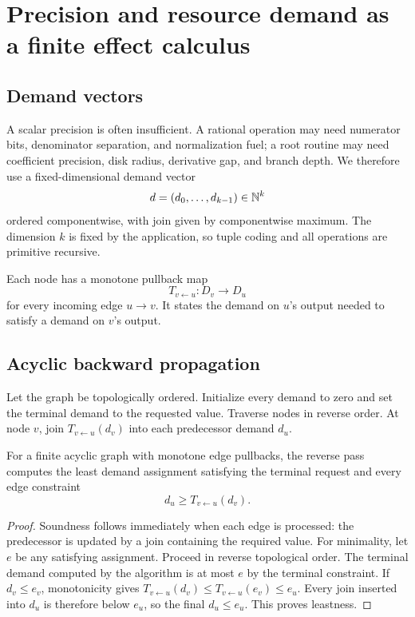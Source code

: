 \section{Precision and resource demand as a finite effect calculus}

\subsection{Demand vectors}

A scalar precision is often insufficient.  A rational operation may need
numerator bits, denominator separation, and normalization fuel; a root routine
may need coefficient precision, disk radius, derivative gap, and branch depth.
We therefore use a fixed-dimensional demand vector
\[
      d=(d_0,\ldots,d_{k-1})\in\mathbb N^k
\]
ordered componentwise, with join given by componentwise maximum.  The dimension
\(k\) is fixed by the application, so tuple coding and all operations are
primitive recursive.

Each node has a monotone pullback map
\[
       T_{v\leftarrow u}:D_v\to D_u
\]
for every incoming edge \(u\to v\).  It states the demand on \(u\)'s output
needed to satisfy a demand on \(v\)'s output.

\subsection{Acyclic backward propagation}

Let the graph be topologically ordered.  Initialize every demand to zero and
set the terminal demand to the requested value.  Traverse nodes in reverse
order.  At node \(v\), join
\(T_{v\leftarrow u}(d_v)\) into each predecessor demand \(d_u\).

\begin{theorem}\label{thm:acyclic-demand}
For a finite acyclic graph with monotone edge pullbacks, the reverse pass
computes the least demand assignment satisfying the terminal request and every
edge constraint
\[
       d_u\ge T_{v\leftarrow u}(d_v).
\]
\end{theorem}

\begin{proof}
Soundness follows immediately when each edge is processed: the predecessor is
updated by a join containing the required value.  For minimality, let \(e\) be
any satisfying assignment.  Proceed in reverse topological order.  The terminal
demand computed by the algorithm is at most \(e\) by the terminal constraint.
If \(d_v\le e_v\), monotonicity gives
\(T_{v\leftarrow u}(d_v)\le T_{v\leftarrow u}(e_v)\le e_u\).
Every join inserted into \(d_u\) is therefore below \(e_u\), so the final
\(d_u\le e_u\).  This proves leastness.
\end{proof}

